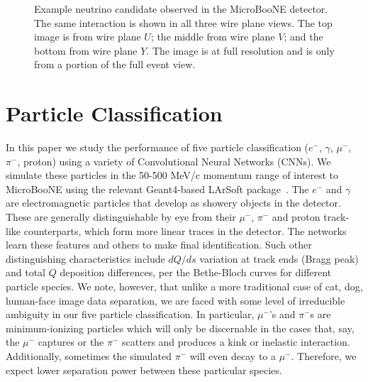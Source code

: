 \documentclass[11pt,a4paper]{article}
\begin{document}
\begin{figure}[t]
  \centering  
\caption{Example neutrino candidate observed in the MicroBooNE detector.  The same interaction is shown in all three wire plane views.  The top image is from wire plane $U$; the middle from wire plane $V$; and the bottom from wire plane $Y$. The image is at full resolution and is only from a portion of the full event view.}
  \label{fig:UBEVD}
\end{figure}



\section{Particle Classification}

In this paper we study the performance of five particle classification ($e^-$, $\gamma$, $\mu^-$, $\pi^-$, proton) using a variety of Convolutional Neural Networks (CNNs). We simulate these particles in the 50-500 MeV/c momentum range of interest to MicroBooNE using the relevant Geant4-based LArSoft package~\cite{larsoft050800}.  The $e^-$ and $\gamma$ are electromagnetic particles that develop as showery objects in the detector. These are generally distinguishable by eye from their $\mu^-$, $\pi^-$ and proton track-like counterparts, which form more linear traces in the detector.  The networks learn these features and others to make final identification. Such other distinguishing characteristics include $dQ/ds$ variation at track ends (Bragg peak) and total $Q$ deposition differences, per the Bethe-Bloch curves for different particle species.  We note, however, that unlike a more traditional case of cat, dog, human-face image data separation, we are faced with some level of irreducible ambiguity in our five particle classification. In particular, $\mu^-$'s and $\pi^-$s are minimum-ionizing particles which will only be discernable in the cases that, say, the $\mu^-$ captures or the $\pi^-$ scatters and produces a kink or inelastic interaction. Additionally, sometimes the simulated $\pi^-$ will even decay to a $\mu^-$.  Therefore, we expect lower separation power between these particular species.
\end{document}
